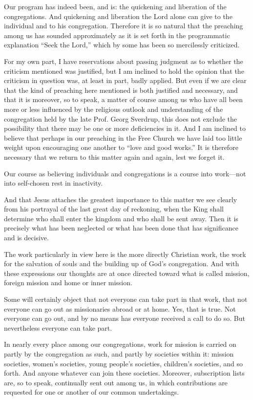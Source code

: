 Our program has indeed been, and is: the quickening and liberation of the congregations. And quickening and liberation the Lord alone can give to the individual and to his congregation. Therefore it is so natural that the preaching among us has sounded approximately as it is set forth in the programmatic explanation “Seek the Lord,” which by some has been so mercilessly criticized.

For my own part, I have reservations about passing judgment as to whether the criticism mentioned was justified, but I am inclined to hold the opinion that the criticism in question was, at least in part, badly applied. But even if we are clear that the kind of preaching here mentioned is both justified and necessary, and that it is moreover, so to speak, a matter of course among us who have all been more or less influenced by the religious outlook and understanding of the congregation held by the late Prof. Georg Sverdrup, this does not exclude the possibility that there may be one or more deficiencies in it. And I am inclined to believe that perhaps in our preaching in the Free Church we have laid too little weight upon encouraging one another to “love and good works.” It is therefore necessary that we return to this matter again and again, lest we forget it.

Our course as believing individuals and congregations is a course into work—not into self-chosen rest in inactivity.

And that Jesus attaches the greatest importance to this matter we see clearly from his portrayal of the last great day of reckoning, when the King shall determine who shall enter the kingdom and who shall be sent away. Then it is precisely what has been neglected or what has been done that has significance and is decisive.

The work particularly in view here is the more directly Christian work, the work for the salvation of souls and the building up of God’s congregation. And with these expressions our thoughts are at once directed toward what is called mission, foreign mission and home or inner mission.

Some will certainly object that not everyone can take part in that work, that not everyone can go out as missionaries abroad or at home. Yes, that is true. Not everyone can go out, and by no means has everyone received a call to do so. But nevertheless everyone can take part.

In nearly every place among our congregations, work for mission is carried on partly by the congregation as such, and partly by societies within it: mission societies, women’s societies, young people’s societies, children’s societies, and so forth. And anyone whatever can join these societies. Moreover, subscription lists are, so to speak, continually sent out among us, in which contributions are requested for one or another of our common undertakings.

